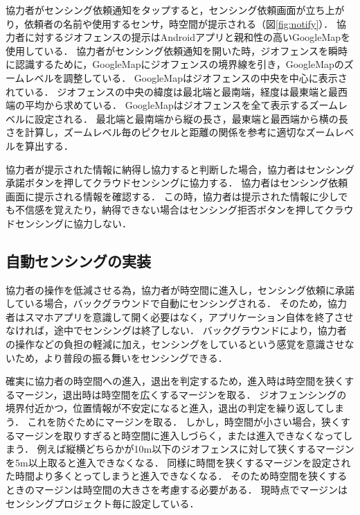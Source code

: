 協力者がセンシング依頼通知をタップすると，センシング依頼画面が立ち上がり，依頼者の名前や使用するセンサ，時空間が提示される（図\ref{fig:notify}）．
協力者に対するジオフェンスの提示はAndroidアプリと親和性の高いGoogleMapを使用している．
協力者がセンシング依頼通知を開いた時，ジオフェンスを瞬時に認識するために，GoogleMapにジオフェンスの境界線を引き，GoogleMapのズームレベルを調整している．
GoogleMapはジオフェンスの中央を中心に表示されている．
ジオフェンスの中央の緯度は最北端と最南端，経度は最東端と最西端の平均から求めている．
GoogleMapはジオフェンスを全て表示するズームレベルに設定される．
最北端と最南端から縦の長さ，最東端と最西端から横の長さを計算し，ズームレベル毎のピクセルと距離の関係\cite{GoogleMap}を参考に適切なズームレベルを算出する．

協力者が提示された情報に納得し協力すると判断した場合，協力者はセンシング承諾ボタンを押してクラウドセンシングに協力する．
協力者はセンシング依頼画面に提示される情報を確認する．
この時，協力者は提示された情報に少しでも不信感を覚えたり，納得できない場合はセンシング拒否ボタンを押してクラウドセンシングに協力しない．



\subsection{自動センシングの実装}
\label{myApp_sensing}
協力者の操作を低減させる為，協力者が時空間に進入し，センシング依頼に承諾している場合，バックグラウンドで自動にセンシングされる．
そのため，協力者はスマホアプリを意識して開く必要はなく，アプリケーション自体を終了させなければ，途中でセンシングは終了しない．
バックグラウンドにより，協力者の操作などの負担の軽減に加え，センシングをしているという感覚を意識させないため，より普段の振る舞いをセンシングできる．

確実に協力者の時空間への進入，退出を判定するため，進入時は時空間を狭くするマージン，退出時は時空間を広くするマージンを取る．
ジオフェンシングの境界付近かつ，位置情報が不安定になると進入，退出の判定を繰り返してしまう．
これを防ぐためにマージンを取る．
しかし，時空間が小さい場合，狭くするマージンを取りすぎると時空間に進入しづらく，または進入できなくなってしまう．
例えば縦横どちらかが10m以下のジオフェンスに対して狭くするマージンを5m以上取ると進入できなくなる．
同様に時間を狭くするマージンを設定された時間より多くとってしまうと進入できなくなる．
そのため時空間を狭くするときのマージンは時空間の大きさを考慮する必要がある．
現時点でマージンはセンシングプロジェクト毎に設定している．

